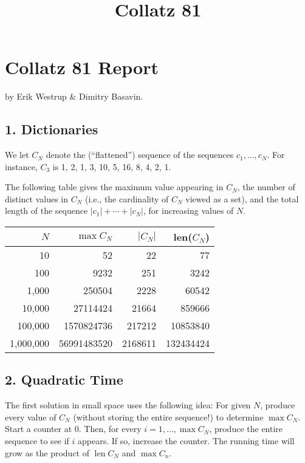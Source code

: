 \documentclass{tufte-handout}
\title{Collatz 81}
\author{}
\begin{document}
\maketitle


\section{Collatz 81 Report}


by Erik Westrup \& Dimitry Basavin.

\subsection{1. Dictionaries}

We let $C_N$ denote the (``flattened'') sequence of the sequences
$c_1,\ldots, c_N$. For instance, $C_3$ is 1, 2, 1, 3, 10, 5, 16, 8, 4,
2, 1.


The following table gives the maximum value appearing in $C_N$, the number
of distinct values in $C_N$ (i.e., the cardinality of $C_N$ viewed as
a set), and the total length of the sequence $|c_1|+\cdots+|c_N|$,
for increasing values of $N$.

\medskip
\begin{tabular}{rrrr}
  \toprule
  $N$ & $\max C_N$ & $|C_N|$ & len($C_N$) \\
  \midrule
  10 & 52 & 22 & 77  \\
  100 &  9232 & 251 & 3242 \\
  1,000 & 250504 & 2228 & 60542 \\
  10,000 & 27114424 & 21664 & 859666 \\
  100,000 & 1570824736 & 217212 & 10853840\\
  1,000,000 & 56991483520 & 2168611 & 132434424 \\
  \bottomrule
\end{tabular}


\subsection{2. Quadratic Time}

The first solution in small space uses the following idea: For given
$N$, produce every value of $C_N$ (without storing the entire
sequence!)
to determine $\max C_N$.
Start a counter at 0.
Then, for every $i=1,\ldots, \max C_N$, produce the entire sequence to
see if $i$ appears.
If so, increase the counter.
The running time will grow as the product of $\operatorname{len}C_N$ and $ \max C_n$.
\end{document}

